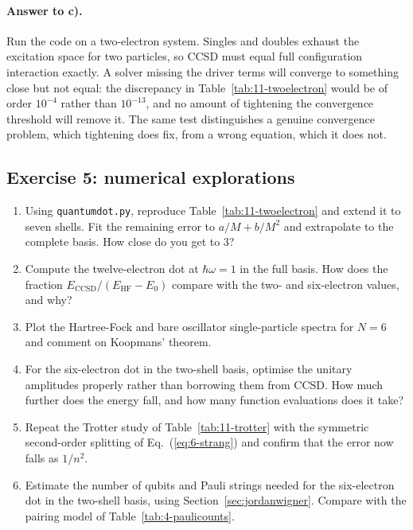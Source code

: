 \paragraph{Answer to c).}
Run the code on a two-electron system.  Singles and doubles exhaust the
excitation space for two particles, so CCSD must equal full configuration
interaction exactly.  A solver missing the driver terms will converge to
something close but not equal: the discrepancy in
Table~\ref{tab:11-twoelectron} would be of order $10^{-4}$ rather than
$10^{-13}$, and no amount of tightening the convergence threshold will remove
it.  The same test distinguishes a genuine convergence problem, which
tightening does fix, from a wrong equation, which it does not.

\subsection*{Exercise 5: numerical explorations}

\begin{enumerate}
  \item[a)] Using \texttt{quantumdot.py}, reproduce
  Table~\ref{tab:11-twoelectron} and extend it to seven shells.  Fit the
  remaining error to $a/M+b/M^2$ and extrapolate to the complete basis.  How
  close do you get to $3$?
  \item[b)] Compute the twelve-electron dot at $\hbar\omega=1$ in the full
  basis.  How does the fraction $E_{\mathrm{CCSD}}/(E_{\mathrm{HF}}-E_0)$
  compare with the two- and six-electron values, and why?
  \item[c)] Plot the Hartree-Fock and bare oscillator single-particle spectra
  for $N=6$ and comment on Koopmans' theorem.
  \item[d)] For the six-electron dot in the two-shell basis, optimise the
  unitary amplitudes properly rather than borrowing them from CCSD.  How much
  further does the energy fall, and how many function evaluations does it
  take?
  \item[e)] Repeat the Trotter study of Table~\ref{tab:11-trotter} with the
  symmetric second-order splitting of Eq.~(\ref{eq:6-strang}) and confirm that
  the error now falls as $1/n^2$.
  \item[f)] Estimate the number of qubits and Pauli strings needed for the
  six-electron dot in the two-shell basis, using
  Section~\ref{sec:jordanwigner}.  Compare with the pairing model of
  Table~\ref{tab:4-paulicounts}.
\end{enumerate}
